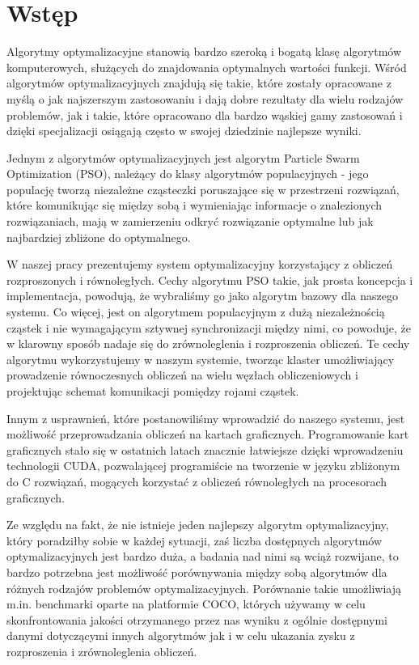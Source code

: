 \documentclass[12pt, twoside, openany, abstract=on]{report}
\theoremstyle{definition}
\begin{document}


\chapter{Wstęp}

Algorytmy optymalizacyjne stanowią bardzo szeroką i bogatą klasę algorytmów komputerowych, służących do znajdowania optymalnych wartości funkcji. Wśród algorytmów optymalizacyjnych znajdują się takie, które zostały opracowane z myślą o jak najszerszym zastosowaniu i dają dobre rezultaty dla wielu rodzajów problemów, jak i takie, które opracowano dla bardzo wąskiej gamy zastosowań i dzięki specjalizacji osiągają często w swojej dziedzinie najlepsze wyniki.

Jednym z algorytmów optymalizacyjnych jest algorytm Particle Swarm Optimization (PSO), należący do klasy algorytmów populacyjnych - jego populację tworzą niezależne cząsteczki poruszające się w przestrzeni rozwiązań, które komunikując się między sobą i wymieniając informacje o znalezionych rozwiązaniach, mają w zamierzeniu odkryć rozwiązanie optymalne lub jak najbardziej zbliżone do optymalnego.

W naszej pracy prezentujemy system optymalizacyjny korzystający z obliczeń rozproszonych i równoległych. Cechy algorytmu PSO takie, jak prosta koncepcja i implementacja, powodują, że wybraliśmy go jako algorytm bazowy dla naszego systemu. Co więcej, jest on algorytmem populacyjnym z dużą niezależnością cząstek i nie wymagającym sztywnej synchronizacji między nimi, co powoduje, że w klarowny sposób nadaje się do zrównoleglenia i rozproszenia obliczeń. Te cechy algorytmu wykorzystujemy w naszym systemie, tworząc klaster umożliwiający prowadzenie równoczesnych obliczeń na wielu węzłach obliczeniowych i projektując schemat komunikacji pomiędzy rojami cząstek. 

Innym z usprawnień, które postanowiliśmy wprowadzić do naszego systemu, jest możliwość przeprowadzania obliczeń na kartach graficznych. Programowanie kart graficznych stało się w ostatnich latach znacznie łatwiejsze dzięki wprowadzeniu technologii CUDA, pozwalającej programiście na tworzenie w języku zbliżonym do C rozwiązań, mogących korzystać z obliczeń równoległych na procesorach graficznych.

Ze względu na fakt, że nie istnieje jeden najlepszy algorytm optymalizacyjny, który poradziłby sobie w każdej sytuacji, zaś liczba dostępnych algorytmów optymalizacyjnych jest bardzo duża, a badania nad nimi są wciąż rozwijane, to bardzo potrzebna jest możliwość porównywania między sobą algorytmów dla różnych rodzajów problemów optymalizacyjnych. Porównanie takie umożliwiają m.in. benchmarki oparte na platformie COCO, których używamy w celu skonfrontowania jakości otrzymanego przez nas wyniku z ogólnie dostępnymi danymi dotyczącymi innych algorytmów jak i w celu ukazania zysku z rozproszenia i zrównoleglenia obliczeń.
\end{document}
